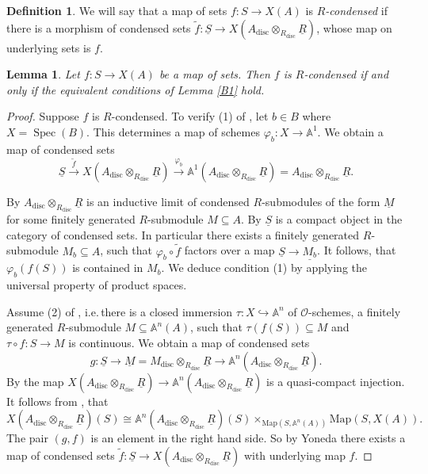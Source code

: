 \documentclass{amsart}
\newtheorem{lem}[prop]{Lemma}
\theoremstyle{definition}
\newtheorem{defi}[prop]{Definition}
\theoremstyle{remark}
\DeclareMathOperator{\Spec}{Spec}
\newcommand{\OO}{\mathcal O}
\newcommand{\Map}{\mathrm{Map}}
\newcommand{\disc}{\operatorname{disc}} %
\begin{document}
\begin{defi} We will say that a map of sets $f:S\rightarrow X(A)$ is \emph{$R$-condensed} if 
there is a morphism of condensed sets $\tilde f : \underline{S} \to X(A_{\disc} \otimes_{R_{\disc}} \underline{R})$, whose map on underlying sets is $f$.
\end{defi}

\begin{lem}\label{ind_cont_equiv_R_cond} Let $f: S\rightarrow X(A)$ be a map of sets. Then $f$ is $R$-condensed if and only if 
the equivalent conditions of Lemma \ref{B1} hold. 
\end{lem} 

\begin{proof}
    Suppose $f$ is $R$-condensed. To verify (1) of , let $b \in B$ where $X=\Spec(B)$. This determines a map of schemes $\varphi_b : X \to \mathbb A^1$.
    We obtain a map of condensed sets 
    $$ \underline S \xrightarrow{\tilde f} X(A_{\disc} \otimes_{R_{\disc}} \underline R) \xrightarrow{\varphi_b} \mathbb A^1(A_{\disc} \otimes_{R_{\disc}} \underline R) = A_{\disc} \otimes_{R_{\disc}} \underline R.$$ 
    
    By  $A_{\disc} \otimes_{R_{\disc}} \underline R$ is an inductive limit of condensed $R$-submodules of the form $\underline M$ for some finitely generated $R$-submodule $M \subseteq A$. By  $\underline S$ is a compact object in the category of condensed sets. In particular there exists a finitely generated $R$-submodule $M_b \subseteq A$, such that $\varphi_b \circ \tilde f$ factors over a map $\underline S \to \underline{M_b}$. It follows, that $\varphi_b(f(S))$ is contained in $M_b$. We deduce condition (1) by applying the universal property of product spaces.

    Assume (2) of , i.e.\,there is a closed immersion $\tau : X \hookrightarrow \mathbb A^n$ of $\OO$-schemes, a finitely generated $R$-submodule $M \subseteq \mathbb A^n(A)$, such that $\tau(f(S)) \subseteq M$ and $\tau \circ f : S \to M$ is continuous. We obtain a map of condensed sets
    $$ g : \underline S \to \underline M = M_{\disc} \otimes_{R_{\disc}} \underline R \to \mathbb A^n(A_{\disc} \otimes_{R_{\disc}} \underline R).$$
    By  the map $X(A_{\disc} \otimes_{R_{\disc}} \underline R) \to \mathbb A^n(A_{\disc} \otimes_{R_{\disc}} \underline R)$ is a quasi-compact injection.
    It follows from \cite[Proposition 4.13]{ScholzeAnalytic}, that
    $$ X(A_{\disc} \otimes_{R_{\disc}} \underline R)(S) \cong \mathbb A^n(A_{\disc} \otimes_{R_{\disc}} \underline R)(S) \times_{\Map(S, \mathbb A^n(A))} \Map(S, X(A)).$$
    The pair $(g,f)$ is an element in the right hand side.
    So by Yoneda there exists a map of condensed sets $\tilde f : \underline S \to X(A_{\disc} \otimes_{R_{\disc}} \underline R)$ with underlying map $f$.
\end{proof}
\end{document}
